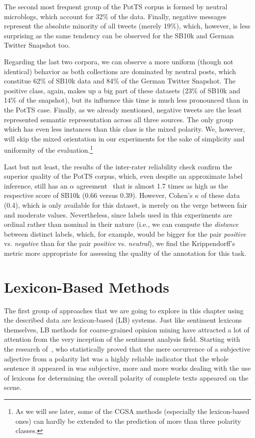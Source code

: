 The second most frequent group of the PotTS corpus is formed by
neutral microblogs, which account for 32\% of the data.  Finally,
negative messages represent the absolute minority of all tweets
(merely 19\%), which, however, is less surprising as the same tendency
can be observed for the SB10k and German Twitter Snapshot too.

Regarding the last two corpora, we can observe a more uniform (though
not identical) behavior as both collections are dominated by neutral
posts, which constitue 62\% of SB10k data and 84\% of the German
Twitter Snapshot.  The positive class, again, makes up a big part of
these datasets (23\% of SB10k and 14\% of the snapshot), but its
influence this time is much less pronounced than in the PotTS case.
Finally, as we already mentioned, negative tweets are the least
represented semantic representation across all three sources.  The
only group which has even less instances than this class is the mixed
polarity.  We, however, will skip the mixed orientation in our
experiments for the sake of simplicity and uniformity of the
evaluation.\footnote{As we will see later, some of the CGSA methods
  (especially the lexicon-based ones) can hardly be extended to the
  prediction of more than three polarity classes.}

Last but not least, the results of the inter-rater reliability check
confirm the superior quality of the PotTS corpus, which, even despite
an approximate label inference, still has an $\alpha$
agreement~\cite{Krippendorff:07} that is almost 1.7 times as high as
the respective score of SB10k (0.66 versus 0.39).  However, Cohen's
$\kappa$ of these data (0.4), which is only available for this
dataset, is merely on the verge between fair and moderate values.
Nevertheless, since labels used in this experiments are ordinal rather
than nominal in their nature (i.e., we can compute the \emph{distance}
between distinct labels, which, for example, would be bigger for the
pair \emph{positive} vs. \emph{negative} than for the pair
\emph{positive} vs. \emph{neutral}), we find the Krippendorff's metric
more appropriate for assessing the quality of the annotation for this
task.

\section{Lexicon-Based Methods}\label{sec:cgsa:lexicon-based}

The first group of approaches that we are going to explore in this
chapter using the described data are lexicon-based (LB) systems.  Just
like sentiment lexicons themselves, LB methods for coarse-grained
opinion mining have attracted a lot of attention from the very
inception of the sentiment analysis field.  Starting with the research
of~\citet{Hatzivassi:00}, who statistically proved that the mere
occurrence of a subjective adjective from a polarity list was a highly
reliable indicator that the whole sentence it appeared in was
subjective, more and more works dealing with the use of lexicons for
determining the overall polarity of complete texts appeared on the
scene.

